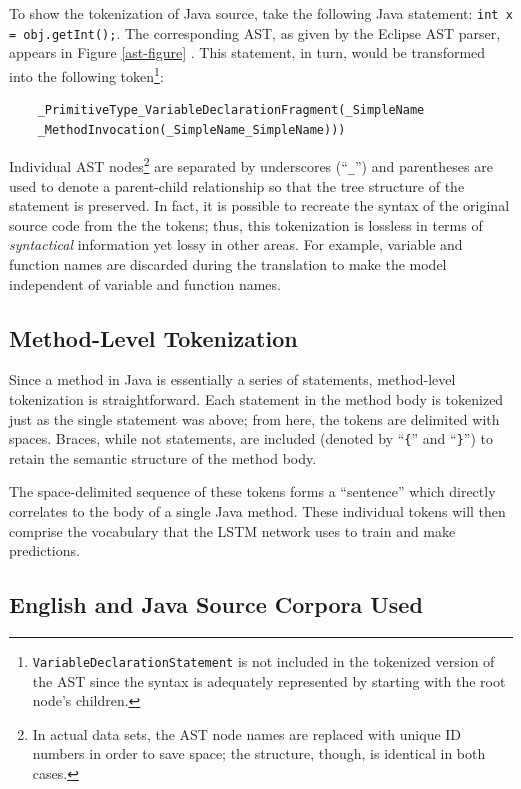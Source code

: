 \documentclass[runningheads,a4paper]{llncs}
\begin{document}
To show the tokenization of Java source, take the following Java statement:
\texttt{int x = obj.getInt();}.
The corresponding AST, as given by the Eclipse AST parser, appears in Figure \ref{ast-figure} \cite{Eclipse}.
This statement, in turn, would be transformed into the following token\footnote{
\texttt{VariableDeclarationStatement} is not included in the
tokenized version of the AST since the syntax is adequately represented
by starting with the root node's children.}:

\begin{verbatim}
    _PrimitiveType_VariableDeclarationFragment(_SimpleName
    _MethodInvocation(_SimpleName_SimpleName))) 
\end{verbatim}

Individual AST nodes\footnote{In actual data sets, the AST node names are replaced with unique
ID numbers in order to save space; the structure, though, is identical in both cases.}
are separated by underscores (``\texttt{\_}'') and parentheses are used
to denote a parent-child relationship so that the tree structure of
the statement is preserved. In fact, it is possible  to recreate the
syntax of the original source  code from the the tokens; thus, this 
tokenization is lossless in terms of  \textit{syntactical} information 
yet lossy in other areas. For example, variable and function names are
discarded during the translation to make the model independent of
variable and function names.

\subsection{Method-Level Tokenization}

Since a method in Java is essentially a series of statements, method-level
tokenization is straightforward.
Each statement in the method body is tokenized just as the single statement 
was above; from here, the tokens are delimited with spaces. Braces, while not 
statements, are included (denoted by ``\texttt\{'' and
``\texttt\}'') to retain the semantic structure of the method body. 

The space-delimited sequence of these tokens forms a ``sentence'' which  
directly  correlates to the body of a single Java method. These individual  
tokens will then comprise the vocabulary that the LSTM network uses to train 
and make predictions.

\subsection{English and Java Source Corpora Used}
\end{document}
